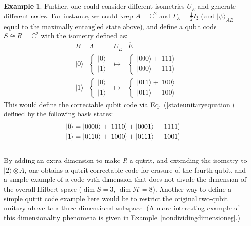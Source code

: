\documentclass[11pt]{amsart}
\theoremstyle{definition}
\newtheorem{example}[thm]{Example}
\theoremstyle{definition}
\theoremstyle{definition}
\newcommand{\1}{\mathbb{I}}
\def\ket#1{| #1 \rangle}
\begin{document}
\begin{example}
Further, one could consider different isometries $U_{\overline{E}}$ and generate different codes. For instance, we could keep $A= \mathbb C^2$ and $\Gamma_A = \frac12 I_2$ (and $\ket{\psi}_{AE}$ equal to the maximally entangled state above), and define a qubit code $S \cong R = \mathbb C^2$ with the isometry defined as: 
\[
\begin{array}{cccc} 
R & A & U_{\overline{E}}  & \overline{E}  \\ \hline 
\ket{0} & \left\{ \begin{array}{l}  \ket{0} \\ \ket{1}  \end{array} \right. & \longmapsto & \left\{ \begin{array}{l}  \ket{000} + \ket{111} \\ \ket{000} - \ket{111}  \end{array} \right. \\ 
\ket{1} & \left\{ \begin{array}{l}  \ket{0} \\ \ket{1}  \end{array} \right. & \longmapsto & \left\{ \begin{array}{l}  \ket{011} + \ket{100}  \\ \ket{011} - \ket{100}   \end{array} \right.  
\end{array} 
\]
This would define the correctable qubit code via Eq.~(\ref{stateunitaryequation}) defined by the following basis states: 
    \begin{align}
        \ket{\tilde{0}} &=  \ket{0000}+\ket{1110} + \ket{0001} - \ket{1111}  &   \notag \\
       \ket{\tilde{1}} &=  \ket{0110}+\ket{1000} + \ket{0111} - \ket{1001}  \notag \\
       \notag
    \end{align} 
By adding an extra dimension to make $R$ a qutrit, and extending the isometry to $\ket{2}\otimes A$, one obtains a qutrit correctable code for erasure of the fourth qubit, and a simple example of a code with dimension that does not divide the dimension of the overall Hilbert space ($\dim S =3$, $\dim \mathcal H = 8$). Another way to define a simple qutrit code example here would be to restrict the original two-qubit unitary above to a three-dimensional subspace. (A more interesting example of this dimensionality phenomena is given in Example~\ref{nondividingdimensioneg}.)    
\end{example}
\end{document}
